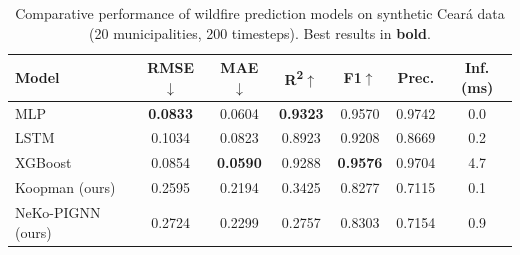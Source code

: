 \begin{table}[htbp]
\centering
\caption{Comparative performance of wildfire prediction models on synthetic Cear\'a data (20 municipalities, 200 timesteps). Best results in \textbf{bold}.}
\label{tab:model_comparison}
\small
\begin{tabular}{@{}lcccccc@{}}
\toprule
\textbf{Model} & \textbf{RMSE}$\downarrow$ & \textbf{MAE}$\downarrow$ & \textbf{R\textsuperscript{2}}$\uparrow$ & \textbf{F1}$\uparrow$ & \textbf{Prec.} & \textbf{Inf. (ms)} \\
\midrule
MLP & \textbf{0.0833} & 0.0604 & \textbf{0.9323} & 0.9570 & 0.9742 & 0.0 \\
LSTM & 0.1034 & 0.0823 & 0.8923 & 0.9208 & 0.8669 & 0.2 \\
XGBoost & 0.0854 & \textbf{0.0590} & 0.9288 & \textbf{0.9576} & 0.9704 & 4.7 \\
Koopman (ours) & 0.2595 & 0.2194 & 0.3425 & 0.8277 & 0.7115 & 0.1 \\
NeKo-PIGNN (ours) & 0.2724 & 0.2299 & 0.2757 & 0.8303 & 0.7154 & 0.9 \\
\bottomrule
\end{tabular}
\end{table}